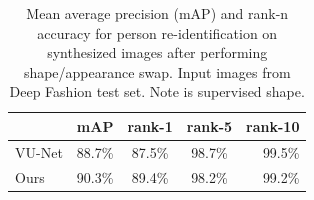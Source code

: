 		\begin{table}[htp]
			\centering
			\caption{Mean average precision (mAP) and rank-n accuracy for person re-identification on synthesized images after performing shape/appearance swap. Input images from Deep Fashion test set. Note \cite{esser18} is supervised \wrt shape.}
			\label{tab:reid}
			\begin{tabular}{l|cccr}
				\hline
				& mAP & rank-1 & rank-5 & rank-10 \\ \hline
				VU-Net \cite{esser18} & 88.7\% & 87.5\% & {98.7}\% & {99.5}\% \\
				Ours & {90.3}\% & {89.4}\% &{98.2}\% & {99.2}\% \\ \hline
			\end{tabular}
		\end{table}

